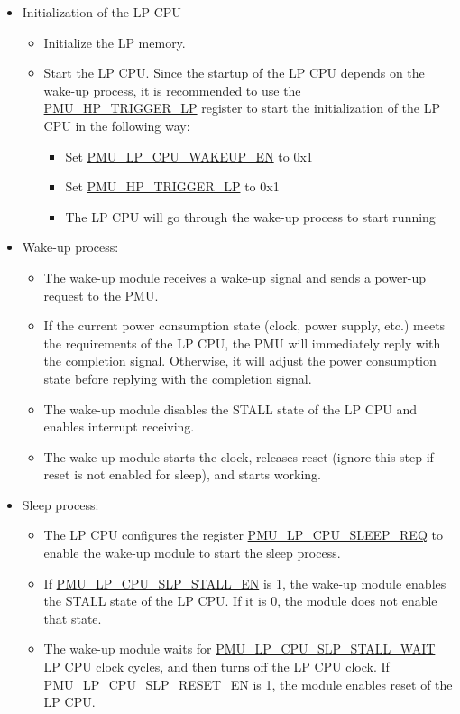 \documentclass[main\_\_EN.tex]{subfiles}
\begin{document}
\begin{itemize}
    \item Initialization of the LP CPU
         \begin{itemize}
         \item Initialize the LP memory.
         \item Start the LP CPU. Since the startup of the LP CPU depends on the wake-up process, it is recommended to use the \hyperref[fielddesc:PMUHPTRIGGERLP]{PMU\_HP\_TRIGGER\_LP} register to start the initialization of the LP CPU in the following way:
             \begin{itemize}
             \item Set \hyperref[fielddesc:PMULPCPUWAKEUPEN]{PMU\_LP\_CPU\_WAKEUP\_EN} to 0x1
             \item Set \hyperref[fielddesc:PMUHPTRIGGERLP]{PMU\_HP\_TRIGGER\_LP} to 0x1
             \item The LP CPU will go through the wake-up process to start running
             \end{itemize}
         \end{itemize}
    \item Wake-up process:
    \begin{itemize}
     \item The wake-up module receives a wake-up signal and sends a power-up request to the PMU.
     \item If the current power consumption state (clock, power supply, etc.) meets the requirements of the LP CPU, the PMU will immediately reply with the completion signal. Otherwise, it will adjust the power consumption state before replying with the completion signal.
     \item The wake-up module disables the STALL state of the LP CPU and enables interrupt receiving.
     \item The wake-up module starts the clock, releases reset (ignore this step if reset is not enabled for sleep), and starts working.
   \end{itemize}

    \item Sleep process:
    \begin{itemize}
    \item The LP CPU configures the register \hyperref[fielddesc:PMULPCPUSLEEPREQ]{PMU\_LP\_CPU\_SLEEP\_REQ} to enable the wake-up module to start the sleep process.
    \item If \hyperref[fielddesc:PMULPCPUSLPSTALLEN]{PMU\_LP\_CPU\_SLP\_STALL\_EN} is 1, the wake-up module enables the STALL state of the LP CPU. If it is 0, the module does not enable that state.
    \item The wake-up module waits for \hyperref[fielddesc:PMULPCPUSLPSTALLWAIT]{PMU\_LP\_CPU\_SLP\_STALL\_WAIT} LP CPU clock cycles, and then turns off the LP CPU clock. If \hyperref[fielddesc:PMULPCPUSLPRESETEN]{PMU\_LP\_CPU\_SLP\_RESET\_EN} is 1, the module enables reset of the LP CPU.
   \end{itemize}
   \end{itemize}
\end{document}
